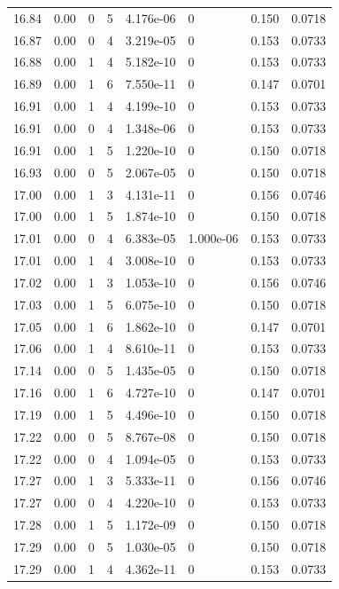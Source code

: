 \documentclass[preview]{standalone}
\begin{document}
{{{{{{{{{{{{{{{{{\begin{tabular}{L{1.2cm}C{1.2cm} C{0.3cm}C{0.5cm} C{1.4cm}C{1.4cm} C{1.4cm}C{1.4cm}}
  16.84  &  0.00  & 0     &  5 &  4.176e-06  & 0  & 0.150 &  0.0718   \\ 
  16.87  &  0.00  & 0     &  4 &  3.219e-05  & 0  & 0.153 &  0.0733   \\ 
  16.88  &  0.00  & 1     &  4 &  5.182e-10  & 0  & 0.153 &  0.0733   \\ 
  16.89  &  0.00  & 1     &  6 &  7.550e-11  & 0  & 0.147 &  0.0701   \\ 
  16.91  &  0.00  & 1     &  4 &  4.199e-10  & 0  & 0.153 &  0.0733   \\ 
  16.91  &  0.00  & 0     &  4 &  1.348e-06  & 0  & 0.153 &  0.0733   \\ 
  16.91  &  0.00  & 1     &  5 &  1.220e-10  & 0  & 0.150 &  0.0718   \\ 
  16.93  &  0.00  & 0     &  5 &  2.067e-05  & 0  & 0.150 &  0.0718   \\ 
  17.00  &  0.00  & 1     &  3 &  4.131e-11  & 0  & 0.156 &  0.0746   \\ 
  17.00  &  0.00  & 1     &  5 &  1.874e-10  & 0  & 0.150 &  0.0718   \\ 
  17.01  &  0.00  & 0     &  4 &  6.383e-05  & 1.000e-06  & 0.153 &  0.0733   \\ 
  17.01  &  0.00  & 1     &  4 &  3.008e-10  & 0  & 0.153 &  0.0733   \\ 
  17.02  &  0.00  & 1     &  3 &  1.053e-10  & 0  & 0.156 &  0.0746   \\ 
  17.03  &  0.00  & 1     &  5 &  6.075e-10  & 0  & 0.150 &  0.0718   \\ 
  17.05  &  0.00  & 1     &  6 &  1.862e-10  & 0  & 0.147 &  0.0701   \\ 
  17.06  &  0.00  & 1     &  4 &  8.610e-11  & 0  & 0.153 &  0.0733   \\ 
  17.14  &  0.00  & 0     &  5 &  1.435e-05  & 0  & 0.150 &  0.0718   \\ 
  17.16  &  0.00  & 1     &  6 &  4.727e-10  & 0  & 0.147 &  0.0701   \\ 
  17.19  &  0.00  & 1     &  5 &  4.496e-10  & 0  & 0.150 &  0.0718   \\ 
  17.22  &  0.00  & 0     &  5 &  8.767e-08  & 0  & 0.150 &  0.0718   \\ 
  17.22  &  0.00  & 0     &  4 &  1.094e-05  & 0  & 0.153 &  0.0733   \\ 
  17.27  &  0.00  & 1     &  3 &  5.333e-11  & 0  & 0.156 &  0.0746   \\ 
  17.27  &  0.00  & 0     &  4 &  4.220e-10  & 0  & 0.153 &  0.0733   \\ 
  17.28  &  0.00  & 1     &  5 &  1.172e-09  & 0  & 0.150 &  0.0718   \\ 
  17.29  &  0.00  & 0     &  5 &  1.030e-05  & 0  & 0.150 &  0.0718   \\ 
  17.29  &  0.00  & 1     &  4 &  4.362e-11  & 0  & 0.153 &  0.0733   \\ 
\hline 
\end{tabular} 

}}}}}}}}}}}}}}}}}
\end{document}
